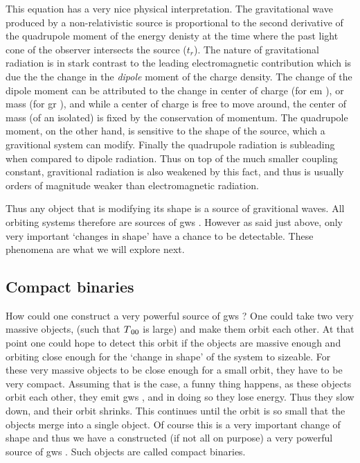 \documentclass[
  10pt,
  a4paper,
  DIV=11,
  numbers=noendperiod,
  twoside]{scrreprt}
\DeclareRobustCommand{\[}{\begin{equation}}
\DeclareRobustCommand{\]}{\end{equation}}
\begin{document}
This equation has a very nice physical interpretation. The gravitational
wave produced by a non-relativistic source is proportional to the second
derivative of the quadrupole moment of the energy denisty at the time
where the past light cone of the observer intersects the source
(\(t_r\)). The nature of gravitational radiation is in stark contrast to
the leading electromagnetic contribution which is due the the change in
the \emph{dipole} moment of the charge density. The change of the dipole
moment can be attributed to the change in center of charge (for \gls{em}
), or mass (for \gls{gr} ), and while a center of charge is free to move
around, the center of mass (of an isolated) is fixed by the conservation
of momentum. The quadrupole moment, on the other hand, is sensitive to
the shape of the source, which a gravitional system can modify. Finally
the quadrupole radiation is subleading when compared to dipole
radiation. Thus on top of the much smaller coupling constant,
gravitional radiation is also weakened by this fact, and thus is usually
orders of magnitude weaker than electromagnetic radiation.

Thus any object that is modifying its shape is a source of gravitional
waves. All orbiting systems therefore are sources of \glspl{gw} .
However as said just above, only very important `changes in shape' have
a chance to be detectable. These phenomena are what we will explore
next.

\hypertarget{sec-compactbinaries}{%
\subsection{Compact binaries}\label{sec-compactbinaries}}

How could one construct a very powerful source of \glspl{gw} ? One could
take two very massive objects, (such that \(\SEco[00]\) is large) and
make them orbit each other. At that point one could hope to detect this
orbit if the objects are massive enough and orbiting close enough for
the `change in shape' of the system to sizeable. For these very massive
objects to be close enough for a small orbit, they have to be very
compact. Assuming that is the case, a funny thing happens, as these
objects orbit each other, they emit \glspl{gw} , and in doing so they
lose energy. Thus they slow down, and their orbit
shrinks. This continues until the orbit is so small that the objects
merge into a single object. Of course this is a very important change of
shape and thus we have a constructed (if not all on purpose) a very
powerful source of \glspl{gw} . Such objects are called compact
binaries.
\end{document}
